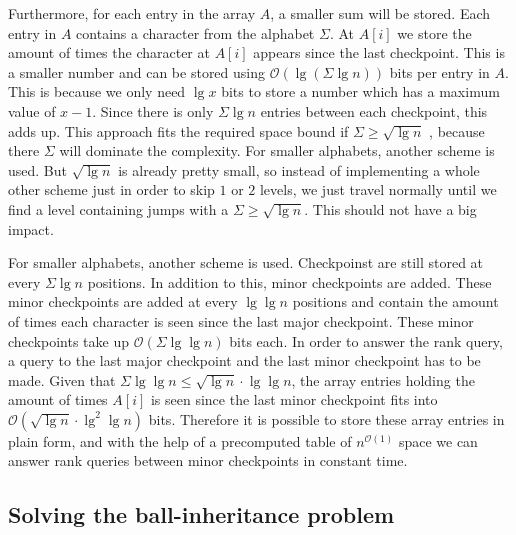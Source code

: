 Furthermore, for each entry in the array $A$, a smaller sum will be stored. Each entry in $A$ contains a character from the alphabet $\Sigma$. At $A[i]$ we store the amount of times the character at $A[i]$ appears since the last checkpoint. This is a smaller number and can be stored using $\mathcal{O}(\lg (\Sigma \lg n))$ bits per entry in $A$. This is because we only need $\lg x$ bits to store a number which has a maximum value of $x-1$. Since there is only $\Sigma \lg n$ entries between each checkpoint, this adds up. This approach fits the required space bound if $\Sigma \geq \sqrt{\lg n}$ , because there $\Sigma$ will dominate the complexity. For smaller alphabets, another scheme is used. But $\sqrt{\lg n}$ is already pretty small, so instead of implementing a whole other scheme just in order to skip $1$ or $2$ levels, we just travel normally until we find a level containing jumps with a $\Sigma \geq \sqrt{\lg n}$. This should not have a big impact. 

For smaller alphabets, another scheme is used. Checkpoinst are still stored at every $\Sigma \lg n$ positions. In addition to this, minor checkpoints are added. These minor checkpoints are added at every $\lg \lg n$ positions and contain the amount of times each character is seen since the last major checkpoint. These minor checkpoints take up $\mathcal{O}(\Sigma \lg \lg n)$ bits each. In order to answer the rank query, a query to the last major checkpoint and the last minor checkpoint has to be made. Given that $\Sigma \lg \lg n \leq \sqrt{\lg n} \cdot \lg \lg n$, the array entries holding the amount of times $A[i]$ is seen since the last minor checkpoint fits into $\mathcal{O}(\sqrt{\lg n} \cdot \lg^2 \lg n)$ bits. Therefore it is possible to store these array entries in plain form, and with the help of a precomputed table of $n^{\mathcal{O}(1)}$ space we can answer rank queries between minor checkpoints in constant time.  


\subsection{Solving the ball-inheritance problem} 
\label{ssection:solving-ball}

